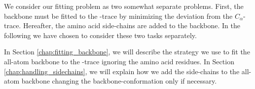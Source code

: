 We consider our fitting problem as two somewhat separate problems.
First, the backbone must be fitted to the \Ca-trace by minimizing
the deviation from the $C_{\alpha}$-trace.  Hereafter, the amino acid
side-chains are added to the backbone.  In the following we have chosen to
consider these two tasks separately.

In Section \ref{chap:fitting_backbone}, we will describe the strategy we use to fit the all-atom backbone to the \Ca-trace ignoring the amino acid residues.
In Section \ref{chap:handling_sidechains}, we will explain how we add the side-chains to the all-atom backbone changing the backbone-conformation only if necessary.

